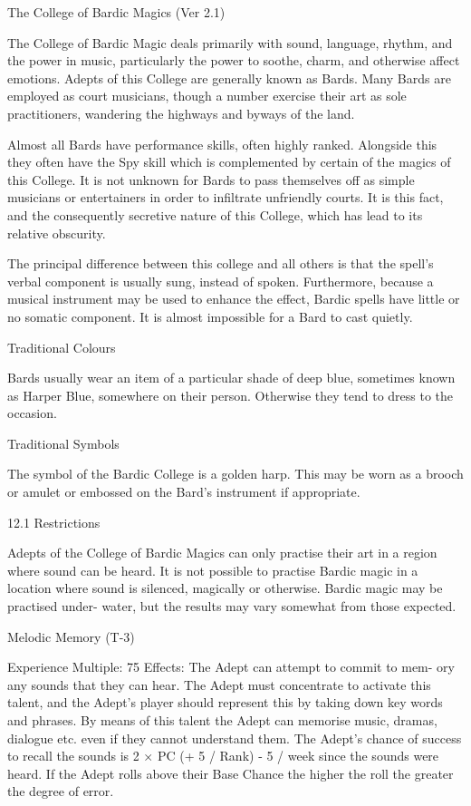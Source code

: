\begin{Chapter}{The College of Bardic Magics (Ver 2.1)}

The College of Bardic Magic deals primarily with sound, language,
rhythm, and the power in music, particularly the power to soothe,
charm, and otherwise affect emotions.  Adepts of this College are
generally known as Bards.  Many Bards are employed as court musicians,
though a number exercise their art as sole practitioners, wandering
the highways and byways of the land.

Almost all Bards have performance skills, often highly ranked.
Alongside this they often have the Spy skill which is complemented by
certain of the magics of this College. It is not unknown for Bards to
pass themselves off as simple musicians or entertainers in order to
infiltrate unfriendly courts.  It is this fact, and the consequently
secretive nature of this College, which has lead to its relative
obscurity.

The principal difference between this college and all others is that
the spell’s verbal component is usually sung, instead of spoken.
Furthermore, because a musical instrument may be used to enhance the
effect, Bardic spells have little or no somatic component.  It is
almost impossible for a Bard to cast quietly.

Traditional Colours 

Bards usually wear an item of a particular shade of deep blue,
sometimes known as Harper Blue, somewhere on their person. Otherwise
they tend to dress to the occasion.

Traditional Symbols 

The symbol of the Bardic College is a golden harp.  This may be worn
as a brooch or amulet or embossed on the Bard’s instrument if
appropriate.

12.1 Restrictions 

Adepts  of  the  College  of  Bardic  Magics  can  only 
practise  their  art  in  a  region  where  sound  can  be 
heard. It is not possible to practise Bardic magic in 
a  location  where  sound  is  silenced,  magically  or 
otherwise.  Bardic  magic  may  be  practised  under-
water,  but  the  results  may  vary  somewhat  from 
those expected. 

Melodic Memory (T-3) 

Experience Multiple: 75 
Effects: The Adept can attempt to commit to mem-
ory any sounds that they can hear. The Adept must 
concentrate  to  activate  this  talent,  and  the  Adept’s 
player  should  represent  this  by  taking  down  key 
words  and  phrases.  By  means  of  this  talent  the 
Adept  can  memorise  music,  dramas,  dialogue  etc. 
even  if  they  cannot  understand  them.  The  Adept’s 
chance of success to recall the sounds is 2 × PC (+ 
5 / Rank) - 5 / week since the sounds were heard. If 
the Adept rolls above their Base Chance the higher 
the roll the greater the degree of error. 


\end{Chapter}
